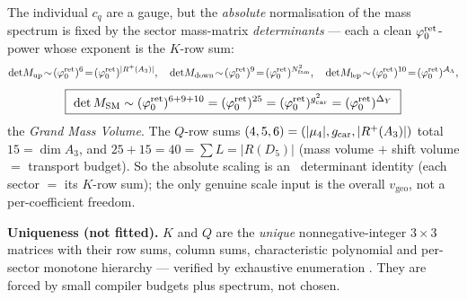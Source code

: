\begin{winbox}
The individual $c_q$ are a gauge, but the \emph{absolute} normalisation of the mass spectrum is fixed by the
sector mass-matrix \emph{determinants} --- each a clean $\varphi_0^{\mathrm{ret}}$-power whose exponent is the $K$-row sum:
\[
  \det\!M_{\mathrm{up}}\!\sim\!(\phiz)^{6}\!=\!(\phiz)^{|R^+(A_3)|},\quad
  \det\!M_{\mathrm{down}}\!\sim\!(\phiz)^{9}\!=\!(\phiz)^{\Nfam^2},\quad
  \det\!M_{\mathrm{lep}}\!\sim\!(\phiz)^{10}\!=\!(\phiz)^{\AL},
\]
\[
  \boxed{\ \det M_{\mathrm{SM}}\sim(\phiz)^{6+9+10}=(\phiz)^{25}=(\phiz)^{\gcar^2}=(\phiz)^{\Delta_Y}\ }
\]
the \emph{Grand Mass Volume}. The $Q$-row sums $(4,5,6)=(|\mu_4|,g_{\mathrm{car}},|R^+(A_3)|)$ total $15=\dim A_3$, and
$25+15=40=\sum L=|R(D_5)|$ (mass volume $+$ shift volume $=$ transport budget). So the absolute scaling is an
\mE\ determinant identity (each sector $=$ its $K$-row sum); the only genuine scale input is the overall
$v_{\mathrm{geo}}$, not a per-coefficient freedom. 
\end{winbox}

\noindent\textbf{Uniqueness (not fitted).} $K$ and $Q$ are the \emph{unique} nonnegative-integer $3\times3$
matrices with their row sums, column sums, characteristic polynomial and per-sector monotone hierarchy ---
verified by exhaustive enumeration . They are forced by small compiler budgets plus
spectrum, not chosen.

